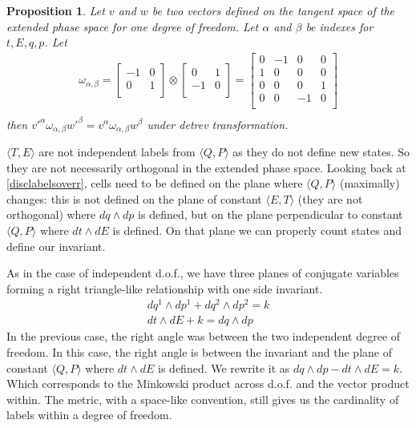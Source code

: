 \documentclass[twocolumn,floatfix,nofootinbib]{revtex4}   %
\theoremstyle{theorem}
\newtheorem{prop}[thm]{Proposition}
\theoremstyle{definition}
\begin{document}
\begin{prop}\label{tdofInvariant}
Let $v$ and $w$ be two vectors defined on the tangent space of the extended phase space for one degree of freedom. Let $\alpha$ and $\beta$ be indexes for $t, E, q, p$. Let
\begin{align*}
\omega_{\alpha, \beta} =  \left[
  \begin{array}{cc}
    -1 & 0 \\
    0 & 1 \\
  \end{array}
\right] \otimes \left[
  \begin{array}{cc}
    0 & 1 \\
    -1 & 0 \\
  \end{array}
\right]
= \left[
  \begin{array}{cccc}
    0 & -1 & 0 & 0 \\
    1 & 0 & 0 & 0 \\
    0 & 0 & 0 & 1 \\
    0 & 0 & -1 & 0 \\
  \end{array}
\right] \\
\end{align*}
then $v'^{\alpha} \omega_{\alpha, \beta} w'^{\beta}=v^{\alpha} \omega_{\alpha, \beta} w^{\beta}$ under detrev transformation.
\end{prop}

$\langle T, E \rangle$ are not independent labels from $\langle Q, P \rangle$ as they do not define new states. So they are not necessarily orthogonal in the extended phase space. Looking back at \ref{disclabelsoverr}, cells need to be defined on the plane where $\langle Q, P \rangle$ (maximally) changes: this is not defined on the plane of constant $\langle E, T \rangle$ (they are not orthogonal) where $dq \wedge dp$ is defined, but on the plane perpendicular to constant $\langle Q, P \rangle$ where $dt \wedge dE$ is defined. On that plane we can properly count states and define our invariant.

As in the case of independent d.o.f., we have three planes of conjugate variables forming a right triangle-like relationship with one side invariant.
\begin{align*}
dq^1 \wedge dp^1 + dq^2 \wedge dp^2 = k \\
dt \wedge dE + k = dq \wedge dp
\end{align*}
In the previous case, the right angle was between the two independent degree of freedom. In this case, the right angle is between the invariant and the plane of constant $\langle Q, P \rangle$ where $dt \wedge dE$ is defined. We rewrite it as $dq \wedge dp - dt \wedge dE = k$. Which corresponds to the Minkowski product across d.o.f. and the vector product within. The metric, with a space-like convention, still gives us the cardinality of labels within a degree of freedom.
\end{document}
